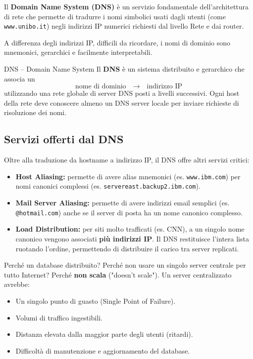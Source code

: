 \documentclass[a4paper,12pt]{report}
\begin{document}
Il \textbf{Domain Name System (DNS)} è un servizio fondamentale dell’architettura di rete
che permette di tradurre i nomi simbolici usati dagli utenti (come \texttt{www.unibo.it})
negli indirizzi IP numerici richiesti dal livello Rete e dai router.

A differenza degli indirizzi IP, difficili da ricordare, i nomi di dominio sono
mnemonici, gerarchici e facilmente interpretabili.

\begin{defbox}{DNS -- Domain Name System}
Il \textbf{DNS} è un sistema distribuito e gerarchico che associa un
\[
\text{nome di dominio} \quad \longrightarrow \quad \text{indirizzo IP}
\]
utilizzando una rete globale di server DNS posti a livelli successivi.
Ogni host della rete deve conoscere almeno un DNS server locale
per inviare richieste di risoluzione dei nomi.
\end{defbox}


\subsection*{Servizi offerti dal DNS}

Oltre alla traduzione da hostname a indirizzo IP, il DNS offre altri servizi critici:

\begin{itemize}
    \item \textbf{Host Aliasing:} permette di avere alias mnemonici (es. \texttt{www.ibm.com}) per nomi canonici complessi (es. \texttt{servereast.backup2.ibm.com}).
    \item \textbf{Mail Server Aliasing:} permette di avere indirizzi email semplici (es. \texttt{@hotmail.com}) anche se il server di posta ha un nome canonico complesso.
    \item \textbf{Load Distribution:} per siti molto trafficati (es. CNN), a un singolo nome canonico vengono associati \textbf{più indirizzi IP}. Il DNS restituisce l'intera lista ruotando l'ordine, permettendo di distribuire il carico tra server replicati.
\end{itemize}

\begin{notebox}{Perché un database distribuito?}
Perché non usare un singolo server centrale per tutto Internet? Perché \textbf{non scala} ("doesn't scale").
Un server centralizzato avrebbe:
\begin{itemize}
    \item Un singolo punto di guasto (Single Point of Failure).
    \item Volumi di traffico ingestibili.
    \item Distanza elevata dalla maggior parte degli utenti (ritardi).
    \item Difficoltà di manutenzione e aggiornamento del database.
\end{itemize}
\end{notebox}
\end{document}
